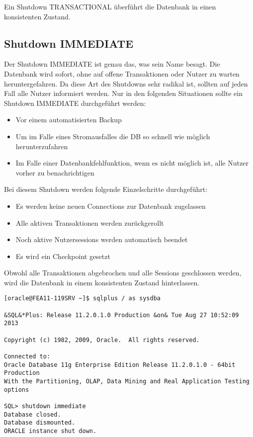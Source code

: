        \begin{merke}
        Ein Shutdown TRANSACTIONAL überführt die Datenbank in einen konsistenten Zustand.
       \end{merke}
      \subsection{Shutdown IMMEDIATE}
        Der Shutdown IMMEDIATE ist genau das, was sein Name besagt. Die Datenbank wird sofort, ohne auf offene Transaktionen oder Nutzer zu warten heruntergefahren. Da diese Art des Shutdowns sehr radikal ist, sollten auf jeden Fall alle Nutzer informiert werden.
\clearpage
        Nur in den folgenden Situationen sollte ein Shutdown IMMEDIATE durchgeführt werden:
        \begin{itemize}
          \item Vor einem automatisierten Backup
          \item Um im Falle eines Stromausfalles die DB so schnell wie möglich herunterzufahren
          \item Im Falle einer Datenbankfehlfunktion, wenn es nicht möglich ist, alle Nutzer vorher zu benachrichtigen
        \end{itemize}
        Bei diesem Shutdown werden folgende Einzelschritte durchgeführt:
        \begin{itemize}
          \item Es werden keine neuen Connections zur Datenbank zugelassen
          \item Alle aktiven Transaktionen werden zurückgerollt
          \item Noch aktive Nutzersessions werden automatisch beendet
          \item Es wird ein Checkpoint gesetzt
        \end{itemize}
    
        \begin{merke}
          Obwohl alle Transaktionen abgebrochen und alle Sessions geschlossen werden, wird die Datenbank in einem konsistenten Zustand hinterlassen.
        \end{merke}
        \begin{lstlisting}[caption={Durchführen eines Shutdown IMMEDIATE},label=admin12,language=sqlplus]
[oracle@FEA11-119SRV ~]$ sqlplus / as sysdba

&SQL&*Plus: Release 11.2.0.1.0 Production &on& Tue Aug 27 10:52:09 2013

Copyright (c) 1982, 2009, Oracle.  All rights reserved.

Connected to:
Oracle Database 11g Enterprise Edition Release 11.2.0.1.0 - 64bit Production
With the Partitioning, OLAP, Data Mining and Real Application Testing options

SQL> shutdown immediate
Database closed.
Database dismounted.
ORACLE instance shut down.
        \end{lstlisting}
